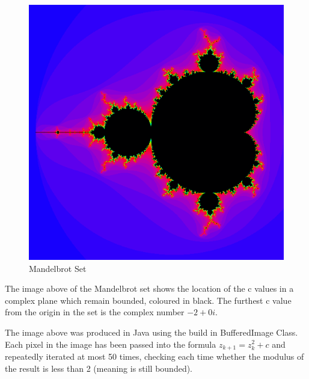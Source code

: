 \documentclass[a4wide, 10pt]{article}
\begin{document}
\begin{figure}[H]
\centering
\includegraphics[scale=0.4]{MandelbrotSet/mandelbrot.png}
\caption{Mandelbrot Set}
\end{figure}

The image above of the Mandelbrot set shows the location of the c values in a complex
   plane which remain bounded, coloured in black. The furthest c value from the origin in the set is the complex number
    $-2+0i$. 
    
The image above was produced in Java using the build in BufferedImage Class. Each pixel in the image
 has been passed into the formula $z_{k+1} = z_{k}^{2} + c$ and repeatedly iterated at most 50 times,
  checking each time whether the modulus of the result is less than 2 (meaning is still bounded).
  
\end{document}
